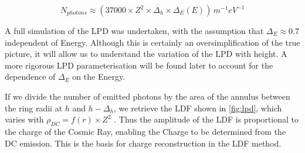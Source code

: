 \documentclass{article}
\begin{document}
\[ N_{photons} \approx (37000 \times Z^{2} \times \Delta_{h} \times \Delta_{E}(E))\, m^{-1}eV^{-1}\]
 

A full simulation of the LPD was undertaken, with the assumption that $\Delta_{E} \approx 0.7$ independent of Energy. Although this is certainly an oversimplification of the true picture, it will allow us to understand the variation of the LPD with height. A more rigorous LPD parameterisation will be found later to account for the dependence of $\Delta_{E}$ on the Energy. 

If we divide the number of emitted photons by the area of the annulus between the ring radii at $h$ and $h - \Delta_{h}$, we retrieve the LDF shown in \ref{fig:lpd}, which varies with $ \rho_{DC}  = f(r) \times Z^{2}$ . Thus the amplitude of the LDF is proportional to the charge of the Cosmic Ray, enabling the Charge to be determined from the DC emission. This is the basis for charge reconstruction in the LDF method.
\end{document}
